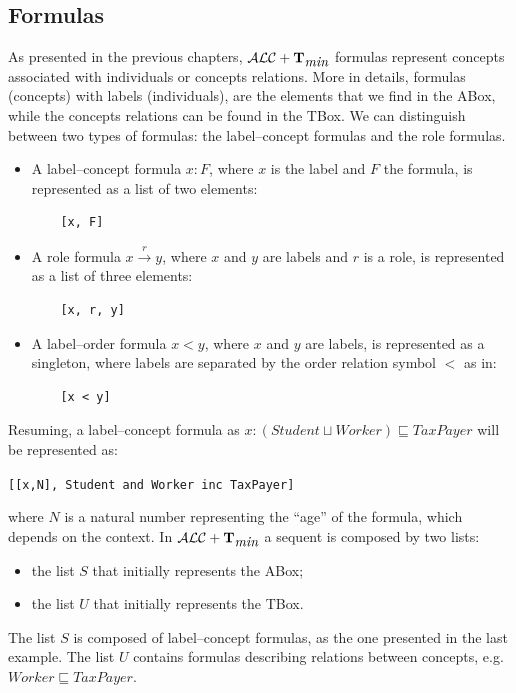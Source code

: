 \documentclass[a4paper, 11pt, oneside]{duthesis}
\newcommand{\tip}{{\bf T}}
\newcommand{\alctmin}{\mathcal{ALC}+\tip_{\mbox{\em min}}}
\newcommand{\trans}[1]{\stackrel{#1}{\longrightarrow}}
\begin{document}
\subsection{Formulas}
As presented in the previous chapters, $\alctmin$ formulas represent concepts associated with individuals or concepts relations.
More in details, formulas (concepts) with labels (individuals), are the elements that we find in the ABox, while the concepts relations can be found in the TBox.
We can distinguish between two types of formulas: the label--concept formulas and the role formulas.
\begin{itemize}
\item A label--concept formula $x : F$, where $x$ is the label and $F$ the formula, is represented as a list of two elements:
\begin{verbatim}
    [x, F]
\end{verbatim}
\item A role formula $x \trans{r} y$, where $x$ and $y$ are labels and $r$ is a role, is represented as a list of three elements:
\begin{verbatim}
    [x, r, y]
\end{verbatim}
\item A label--order formula $x < y$, where $x$ and $y$ are labels, is represented as a singleton, where labels are separated by the order relation symbol $<$ as in:
\begin{verbatim}
    [x < y]
\end{verbatim}
\end{itemize}
Resuming, a label--concept formula as $x : (Student \sqcup Worker) \sqsubseteq TaxPayer$ will be represented as:
\begin{center}\texttt{[[x,N], Student and Worker inc TaxPayer]}\end{center}

where $N$ is a natural number representing the ``age'' of the formula, which depends on the context.
In $\alctmin$ a sequent is composed by two lists:
\begin{itemize}
\item the list $S$ that initially represents the ABox;
\item the list $U$ that initially represents the TBox.
\end{itemize}
The list $S$ is composed of label--concept formulas, as the one presented in the last example.
The list $U$ contains formulas describing relations between concepts, e.g. $Worker \sqsubseteq TaxPayer$.
\end{document}
